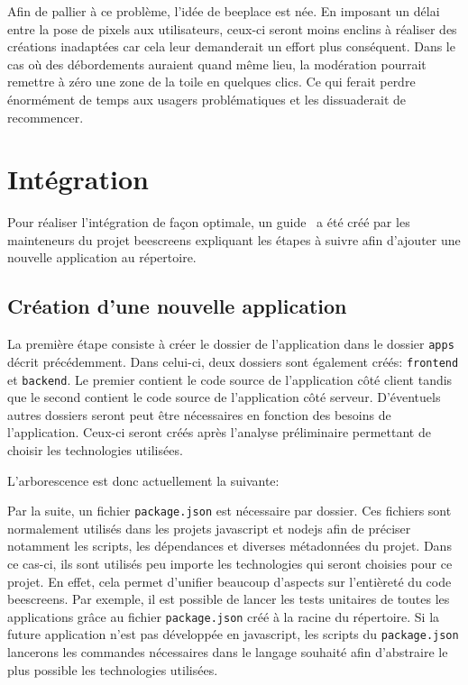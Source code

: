 Afin de pallier à ce problème, l'idée de \gls{beeplace} est née. En imposant un délai entre la pose de pixels aux utilisateurs, ceux-ci seront moins enclins à réaliser des créations inadaptées car cela leur demanderait un effort plus conséquent. Dans le cas où des débordements auraient quand même lieu, la modération pourrait remettre à zéro une zone de la toile en quelques clics. Ce qui ferait perdre énormément de temps aux usagers problématiques et les dissuaderait de recommencer.

\section{Intégration}

Pour réaliser l'intégration de façon optimale, un guide~\cite{addapptobeescreens} a été créé par les mainteneurs du projet \gls{beescreens} expliquant les étapes à suivre afin d'ajouter une nouvelle application au répertoire.

\subsection{Création d'une nouvelle application}

La première étape consiste à créer le dossier de l'application dans le dossier \texttt{apps} décrit précédemment. Dans celui-ci, deux dossiers sont également créés: \texttt{frontend} et \texttt{backend}. Le premier contient le code source de l'application côté client tandis que le second contient le code source de l'application côté serveur. D'éventuels autres dossiers seront peut être nécessaires en fonction des besoins de l'application. Ceux-ci seront créés après l'analyse préliminaire permettant de choisir les technologies utilisées.

L'arborescence est donc actuellement la suivante:


Par la suite, un fichier \texttt{package.json} est nécessaire par dossier. Ces fichiers sont normalement utilisés dans les projets \gls{javascript} et \gls{nodejs} afin de préciser notamment les scripts, les dépendances et diverses métadonnées du projet. Dans ce cas-ci, ils sont utilisés peu importe les technologies qui seront choisies pour ce projet. En effet, cela permet d'unifier beaucoup d'aspects sur l'entièreté du code \gls{beescreens}. Par exemple, il est possible de lancer les tests unitaires de toutes les applications grâce au fichier \texttt{package.json} créé à la racine du répertoire. Si la future application n'est pas développée en \gls{javascript}, les scripts du \texttt{package.json} lancerons les commandes nécessaires dans le langage souhaité afin d'abstraire le plus possible les technologies utilisées.

